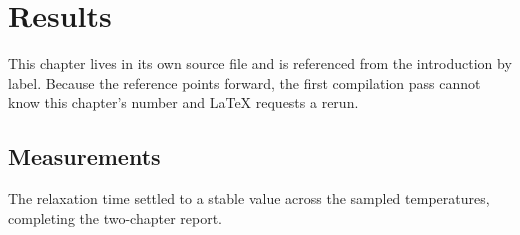 \chapter{Results}\label{chap:results}

This chapter lives in its own source file and is referenced from the
introduction by label. Because the reference points forward, the first
compilation pass cannot know this chapter's number and LaTeX requests a rerun.

\section{Measurements}

The relaxation time settled to a stable value across the sampled temperatures,
completing the two-chapter report.

